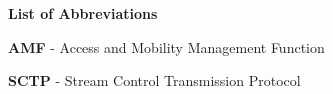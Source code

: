 \documentclass{iitthesis}
\begin{document}
	\justifying
	
	
	
	
	\cleardoublepage
	\tableofcontents
	\cleardoublepage
	\listoffigures
	\listoftables
	\newpage
	\thispagestyle{empty} %
	\null
	\newpage

	\textbf{\LARGE List of Abbreviations}
	\begin{description}
		\item \textbf{AMF} - Access and Mobility Management Function
		\item \textbf{SCTP} - Stream Control Transmission Protocol
		
	\end{description}
	
	\newpage
	\thispagestyle{empty}
	\cleardoublepage
	
	
	 
	 
	
	\singlespacing
	\nocite{*}
	
	

	
	
\end{document}
